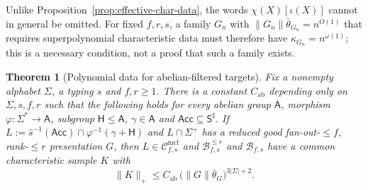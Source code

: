 \documentclass[11pt]{article}
\numberwithin{equation}{section}
\theoremstyle{plain}
\newtheorem{theorem}{Theorem}[section]
\theoremstyle{definition}
\theoremstyle{remark}
\newcommand{\Cmcf}[2]{\mathcal{C}^{\mathrm{mcf}}_{#1,#2}}
\theoremstyle{plain}
\begin{document}
Unlike Proposition~\ref{prop:effective-char-data}, the words $\chi(X)[\iota(X)]$
cannot in general be omitted.  For fixed $f,r,s$, a family $G_n$ with
$\|G_n\|\bar\theta_{G_n}=n^{O(1)}$ that requires superpolynomial characteristic
data must therefore have $\kappa_{G_n}=n^{\omega(1)}$; this is a necessary
condition, not a proof that such a family exists.

\begin{theorem}[Polynomial data for abelian-filtered targets]
\label{thm:mcfg-abelian-filter-data}
Fix a nonempty alphabet $\Sigma$, a typing $s$ and $f,r\ge1$.  There is a constant
$C_{\mathrm{ab}}$ depending only on $\Sigma,s,f,r$ such that the following holds for every
abelian group $\mathsf A$, morphism $\varphi:\Sigma^*\to\mathsf A$, subgroup
$\mathsf H\le\mathsf A$, $\gamma\in\mathsf A$ and $\mathsf{Acc}\subseteq\mathsf S^\sharp$.
If $L:=\widehat s^{-1}(\mathsf{Acc})\cap\varphi^{-1}(\gamma+\mathsf H)$ and $L\cap\Sigma^+$
has a reduced good fan-out-$\le f$, rank-$\le r$ presentation $G$, then
$L\in\Cmcf{f}{s}$ and $\mathcal B^{\le r}_{f,s}$ and $\mathcal B_{f,s}$ have a common
characteristic sample $K$ with
\[
 \|K\|_+\le C_{\mathrm{ab}}\,\bigl(\|G\|\bar\theta_G\bigr)^{3|\Sigma|+2}.
\]
\end{theorem}
\end{document}
